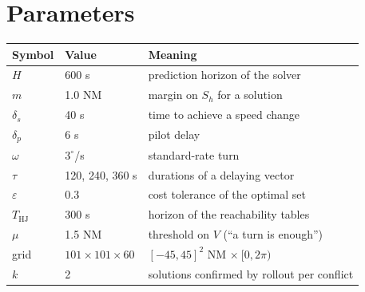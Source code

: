 \documentclass[11pt,a4paper]{article}
\newcommand{\Sh}{S_h}
\begin{document}
\section{Parameters}\label{app:params}
\begin{center}
\small
\begin{tabular}{lll}
\toprule
Symbol & Value & Meaning \\
\midrule
$H$ & 600 s & prediction horizon of the solver\\
$m$ & 1.0 NM & margin on $\Sh$ for a solution\\
$\delta_s$ & 40 s & time to achieve a speed change\\
$\delta_p$ & 6 s & pilot delay\\
$\omega$ & $3^\circ$/s & standard-rate turn\\
$\tau$ & 120, 240, 360 s & durations of a delaying vector\\
$\varepsilon$ & 0.3 & cost tolerance of the optimal set\\
$T_{\mathrm{HJ}}$ & 300 s & horizon of the reachability tables\\
$\mu$ & 1.5 NM & threshold on $V$ (``a turn is enough'')\\
grid & $101\times101\times60$ & $[-45,45]^2$ NM $\times\ [0,2\pi)$\\
$k$ & 2 & solutions confirmed by rollout per conflict\\
\bottomrule
\end{tabular}
\end{center}
\end{document}
